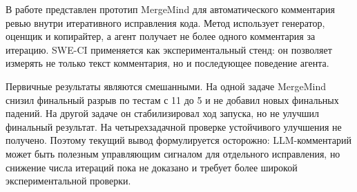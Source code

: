 \documentclass[12pt,a4paper]{article}
\begin{document}
В работе представлен прототип MergeMind для автоматического комментария ревью
внутри итеративного исправления кода. Метод использует генератор, оценщик и
копирайтер, а агент получает не более одного комментария за итерацию. SWE-CI
применяется как экспериментальный стенд: он позволяет измерять
не только текст комментария, но и последующее поведение агента.

Первичные результаты являются смешанными. На одной задаче MergeMind снизил
финальный разрыв по тестам с 11 до 5 и не добавил новых финальных падений. На
другой задаче он стабилизировал ход запуска, но не улучшил финальный результат.
На четырехзадачной проверке устойчивого улучшения не получено. Поэтому текущий
вывод формулируется осторожно: LLM-комментарий может быть полезным управляющим
сигналом для отдельного исправления, но снижение числа итераций пока не
доказано и требует более широкой экспериментальной проверки.
\end{document}
